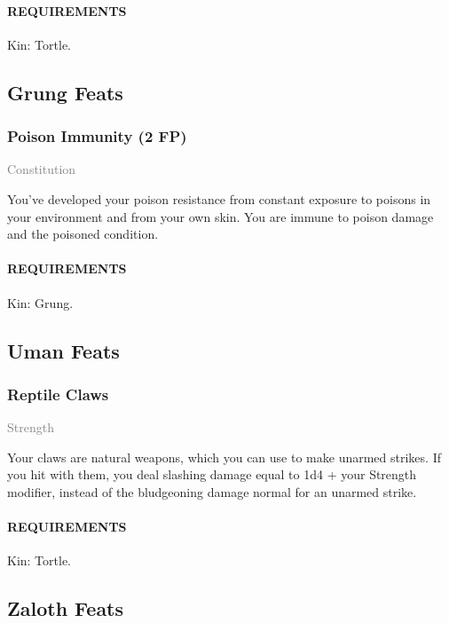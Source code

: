     \paragraph{REQUIREMENTS} Kin: Tortle.

\subsection*{Grung Feats}
    \subsubsection{Poison Immunity (2 FP)} \label{feat::poisonimmunity}
    \small{\textcolor{gray}{Constitution}}

    \normalsize
    You've developed your poison resistance from constant exposure to poisons in your environment and from your own skin.
    You are immune to poison damage and the poisoned condition.
    \paragraph{REQUIREMENTS} Kin: Grung.

\subsection*{Uman Feats}
    \subsubsection{Reptile Claws} \label{feat::reptileclaws}
    \small{\textcolor{gray}{Strength}}

    \normalsize
    Your claws are natural weapons, which you can use to make unarmed strikes.
    If you hit with them, you deal slashing damage equal to 1d4 + your Strength modifier, instead of the bludgeoning damage normal for an unarmed strike.
    \paragraph{REQUIREMENTS} Kin: Tortle.

\subsection*{Zaloth Feats}
